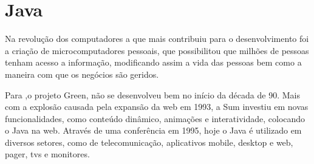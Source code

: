 










\section{Java}

\par  Na revolução dos computadores a que mais contribuiu para o desenvolvimento
foi a criação de microcomputadores pessoais, que possibilitou que milhões de
pessoas tenham acesso a informação, modificando assim a vida das pessoas bem
como a maneira com que os negócios são geridos.

% 

\par Para ,o projeto Green, não se desenvolveu bem no início da década de 90.
Mais com a explosão causada pela expansão da web em 1993, a Sum investiu em novas 
funcionalidades, como conteúdo dinâmico,
animações e interatividade, colocando o Java na web. 
Através de uma conferência em 1995, hoje o Java é utilizado em diversos
setores, como de telecomunicação, aplicativos mobile, desktop e web, pager, tvs
e monitores.


